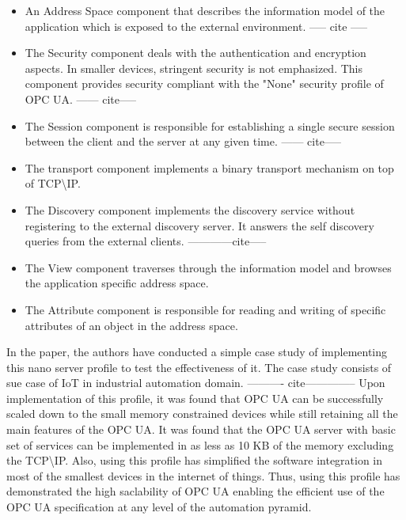 \documentclass[conference]{IEEEtran}
\begin{document}
\begin{itemize}
\item An Address Space component that describes the information model of the application which is exposed to the external environment. ----- cite -----

\item The Security component deals with the authentication and encryption aspects. In smaller devices, stringent security is not emphasized. This component provides security compliant with the "None" security profile of OPC UA.  ------ cite-----

\item The Session component is responsible for establishing a single secure session between the client and the server at any given time. ------ cite-----

\item The transport component implements a binary transport mechanism on top of TCP\textbackslash IP.

\item The Discovery component implements the discovery service without registering to the external discovery server. It answers the self discovery queries from the external clients. ------------cite-----

\item The View component traverses through the information model and browses the application specific address space.

\item The Attribute component is responsible for reading and writing of specific attributes of an object in the address space.
\end{itemize}

In the paper, the authors have conducted a simple case study of implementing this nano server profile to test the effectiveness of it. The case study consists of sue case of IoT in industrial automation domain. ---------- cite--------------
Upon implementation of this profile, it was found that OPC UA can be successfully scaled down to the small memory constrained devices while still retaining all the main features of the OPC UA.
It was found that the OPC UA server with basic set of services can be implemented in as less as 10 KB of the memory excluding the TCP\textbackslash IP.
Also, using this profile has simplified the software integration  in most of the smallest devices in the internet of things. Thus, using this profile has demonstrated the high saclability of OPC UA enabling the efficient use of the OPC UA specification at any level of the automation pyramid.
\end{document}

